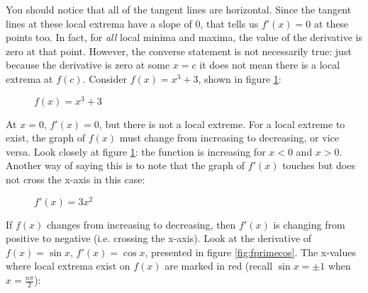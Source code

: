 
You should notice that all of the tangent lines are horizontal. Since the tangent lines at these local extrema have a slope of $0$, that tells us $f'(x)=0$ at these points too. In fact, for \textit{all} local minima and maxima, the value of the derivative is zero at that point. However, the converse statement is not necessarily true: just because the derivative is zero at some $x=c$ it does not mean there is a local extrema at $f(c)$. Consider $f(x) = x^3+3$, shown in figure  \ref{fig:nonextrema}:

\begin{figure}
	\centering
	\caption{$f(x) = x^3+3$}
	\label{fig:nonextrema}
\end{figure}


At $x=0$, $f'(x)=0$, but there is not a local extreme. For a local extreme to exist, the graph of $f(x)$ must change from increasing to decreasing, or vice versa. Look closely at figure \ref{fig:nonextrema}: the function is increasing for $x<0$ and $x>0$. Another way of saying this is to note that the graph of $f'(x)$ touches but does not cross the x-axis in this case:

\begin{figure}
	\centering
	\caption{$f'(x) = 3x^2$}
	\label{fig:touch}
\end{figure}


If $f(x)$ changes from increasing to decreasing, then $f'(x)$ is changing from positive to negative (i.e. crossing the x-axis). Look at the derivative of $f(x)=\sin{x}$, $f'(x)=\cos{x}$, presented in figure \ref{fig:fprimecos}. The x-values where local extrema exist on $f(x)$ are marked in red (recall $\sin{x} = \pm 1$ when $x=\frac{n\pi}{2}$):

